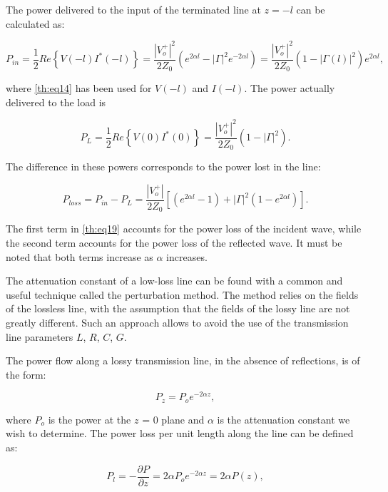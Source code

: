 \noindent The power delivered to the input of the terminated line at $z = -l$ can be calculated as:

\begin{equation}\label{th:eq17}
P_{in}=\frac{1}{2}Re\left\{ V(-l)I^{*}(-l) \right\}=\frac{|V_{o}^{+}|^2}{2Z_{0}}(e^{2\alpha l}-|\Gamma |^{2}e^{-2\alpha l})=\frac{|V_{o}^{+}|^2}{2Z_{0}}(1-|\Gamma (l)|^{2})e^{2\alpha l},
\end{equation}

\noindent where \ref{th:eq14} has been used for $V(-l)$ and $I(-l)$. The power actually delivered to the
load is

\begin{equation}\label{th:eq18}
P_{L}=\frac{1}{2}Re\left\{ V(0)I^{*}(0) \right\}=\frac{|V_{o}^{+}|^{2}}{2Z_{0}}(1-|\Gamma |^{2}). 
\end{equation}

\noindent The difference in these powers corresponds to the power lost in the line:

\begin{equation}\label{th:eq19}
P_{loss}=P_{in}-P_{L}=\frac{|V_{o}^{+}|}{2Z_{0}}\left[ (e^{2\alpha l}-1)+|\Gamma |^{2}(1-e^{2\alpha l}) \right].
\end{equation}

\noindent The first term in \ref{th:eq19} accounts for the power loss of the incident wave, while the second
term accounts for the power loss of the reflected wave. It must be noted that both terms increase as $\alpha $
increases.

\indent The attenuation constant of a low-loss line can be found with a common and useful technique called the perturbation method. The method relies on the fields of the lossless line, with the assumption that the fields of the lossy line are not greatly different. Such an approach allows to avoid the use of the transmission line parameters $L$, $R$, $C$, $G$.

\indent The power flow along a lossy transmission line, in the absence of reflections, is of the form:

\begin{equation}\label{th:eq20}
P_{z}=P_{o}e^{-2\alpha z},
\end{equation}

\noindent where $P_{o}$ is the power at the $z$ = 0 plane and $\alpha $ is the attenuation constant we wish to determine. The power loss per unit length along the line can be defined as:

\begin{equation}\label{th:eq21}
P_{l}=-\frac{\partial{P}}{\partial{z}}=2\alpha P_{o}e^{-2\alpha z}=2\alpha P(z),
\end{equation}

